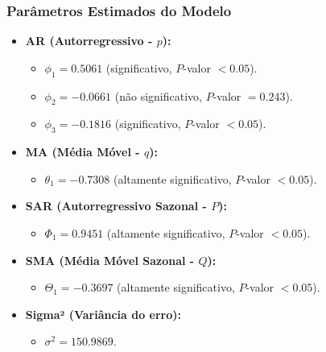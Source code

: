 \documentclass[a4paper, 12pt]{article}
\begin{document}
\subsubsection*{Parâmetros Estimados do Modelo}
\begin{itemize}
    \item \textbf{AR (Autorregressivo - \(p\)):}
    \begin{itemize}
        \item \( \phi_1 = 0.5061 \) (significativo, \(P\)-valor \(< 0.05\)).
        \item \( \phi_2 = -0.0661 \) (não significativo, \(P\)-valor \(= 0.243\)).
        \item \( \phi_3 = -0.1816 \) (significativo, \(P\)-valor \(< 0.05\)).
    \end{itemize}
    \item \textbf{MA (Média Móvel - \(q\)):}
    \begin{itemize}
        \item \( \theta_1 = -0.7308 \) (altamente significativo, \(P\)-valor \(< 0.05\)).
    \end{itemize}
    \item \textbf{SAR (Autorregressivo Sazonal - \(P\)):}
    \begin{itemize}
        \item \( \Phi_1 = 0.9451 \) (altamente significativo, \(P\)-valor \(< 0.05\)).
    \end{itemize}
    \item \textbf{SMA (Média Móvel Sazonal - \(Q\)):}
    \begin{itemize}
        \item \( \Theta_1 = -0.3697 \) (altamente significativo, \(P\)-valor \(< 0.05\)).
    \end{itemize}
    \item \textbf{Sigma² (Variância do erro):}
    \begin{itemize}
        \item \( \sigma^2 = 150.9869 \).
    \end{itemize}
\end{itemize}
\end{document}

